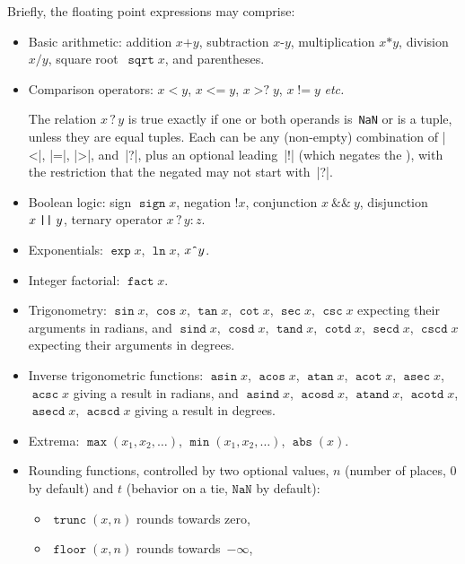 \documentclass{ltxguide}
\providecommand\fpop[1]{\mathop{\texttt{#1}}}
\providecommand\fpbin[1]{\mathbin{\texttt{#1}}}
\providecommand\fprel[1]{\mathrel{\texttt{#1}}}
\providecommand\nan{\texttt{NaN}}
\begin{document}
Briefly, the floating point expressions may comprise:
\begin{itemize}
  \item Basic arithmetic: addition $x\fpbin{+}y$, subtraction $x\fpbin{-}y$,
    multiplication $x\fpbin{*}y$, division $x\fpbin{/}y$, square root~$\fpop{sqrt}{x}$,
    and parentheses.
  \item Comparison operators: $x\fprel{<}y$,
    $x\fprel{<=}y$, $x\fprel{>?}y$,
    $x\fprel{!=}y$ \emph{etc.}
    
    The relation $x\fprel{?}y$ is true exactly if one or both operands is~\nan{} or is
   a tuple, unless they are equal tuples. Each 
   can be any (non-empty) combination of |<|, |=|, |>|, and~|?|, plus
   an optional leading~|!| (which negates the ), with
   the restriction that the negated  may not start with~|?|.
  \item Boolean logic: sign $\fpop{sign} x$,
    negation $\fpop{!}x$, conjunction
    $x\fprel{\&\&}y$, disjunction $x\fprel{\string|\string|}y$, ternary
    operator $x\fprel{?}y\fprel{:}z$.
  \item Exponentials: $\fpop{exp} x$, $\fpop{ln} x$, $x\mathord{\texttt{\^{}}}y$.
  \item Integer factorial: $\fpop{fact} x$.
  \item Trigonometry: $\fpop{sin} x$, $\fpop{cos} x$, $\fpop{tan} x$, $\fpop{cot} x$, $\fpop{sec}
    x$, $\fpop{csc} x$ expecting their arguments in radians, and
    $\fpop{sind} x$, $\fpop{cosd} x$,
    $\fpop{tand} x$, $\fpop{cotd} x$,
    $\fpop{secd} x$, $\fpop{cscd} x$ expecting their
    arguments in degrees.
  \item Inverse trigonometric functions: $\fpop{asin} x$,
    $\fpop{acos} x$, $\fpop{atan} x$,
    $\fpop{acot} x$, $\fpop{asec} x$,
    $\fpop{acsc} x$ giving a result in radians, and
    $\fpop{asind} x$, $\fpop{acosd} x$,
    $\fpop{atand} x$, $\fpop{acotd} x$,
    $\fpop{asecd} x$, $\fpop{acscd} x$ giving a result
    in degrees.
  \item Extrema: $\fpop{max}(x_{1},x_{2},\ldots)$, $\fpop{min}(x_{1},x_{2},\ldots)$,
    $\fpop{abs}(x)$.
  \item Rounding functions, controlled by two optional
    values,  $n$ (number of places, $0$ by default) and
      $t$ (behavior on a tie, $\nan$ by default):
    \begin{itemize}
    \item $\fpop{trunc}(x,n)$ rounds towards zero,
    \item $\fpop{floor}(x,n)$ rounds towards~$-\infty$,

\end{itemize}
\end{itemize}
\end{document}
